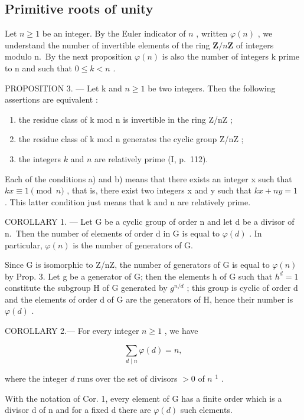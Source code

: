 \subsection{Primitive roots of unity}

Let \(n \geqslant 1\) be an integer. By the Euler indicator of \(n\) , written \(\varphi(n)\) , we understand the number of invertible elements of the ring \(\mathbf{Z}/n\mathbf{Z}\) of integers modulo n.~By the next proposition \(\varphi(n)\) is also the number of integers k prime to n and such that \(0 \leqslant k < n\) .

PROPOSITION 3. --- Let k and \(n \geqslant 1\) be two integers. Then the following assertions are equivalent :

\begin{enumerate}
\def\labelenumi{\alph{enumi})}
\item
  the residue class of k mod n is invertible in the ring Z/nZ ;
\item
  the residue class of k mod n generates the cyclic group Z/nZ ;
\item
  the integers \(k\) and \(n\) are relatively prime (I, p.~112).
\end{enumerate}

Each of the conditions a) and b) means that there exists an integer x such that \(kx \equiv 1 \pmod{n}\) , that is, there exist two integers x and y such that \(kx + ny = 1\) . This latter condition just means that k and n are relatively prime.

COROLLARY 1. --- Let G be a cyclic group of order n and let d be a divisor of n.~Then the number of elements of order d in G is equal to \(\varphi(d)\) . In particular, \(\varphi(n)\) is the number of generators of G.

Since G is isomorphic to Z/nZ, the number of generators of G is equal to \(\varphi(n)\) by Prop. 3. Let g be a generator of G; then the elements h of G such that \(h^{d}=1\) constitute the subgroup H of G generated by \(g^{n/d}\) ; this group is cyclic of order d and the elements of order d of G are the generators of H, hence their number is \(\varphi(d)\) .

COROLLARY 2.--- For every integer \(n \geqslant 1\) , we have

\[
\sum_ {d \mid n} \varphi (d) = n,\tag{1}
\]

where the integer \(d\) runs over the set of divisors \(>0\) of \(n\) \(^{1}\) .

With the notation of Cor. 1, every element of G has a finite order which is a divisor d of n and for a fixed d there are \(\varphi(d)\) such elements.

